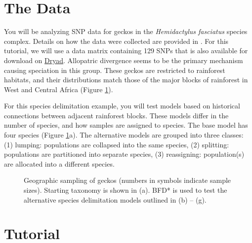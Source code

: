 \documentclass{article}
\begin{document}
\section{The Data}
You will be analyzing SNP data for geckos in the \textit{Hemidactylus fasciatus} species complex. Details on how the data were collected are 
provided in \citep{Leache14}. For this tutorial, we will use a data matrix containing 129 SNPs that is also available for download on \href{http://datadryad.org/resource/doi:10.5061/dryad.r55fb}{Dryad}. Allopatric divergence seems to be the primary mechanism causing speciation in this group. These geckos are restricted to rainforest habitats, and their distributions match those of the major blocks of rainforest in West and Central Africa (Figure \ref{fig:map}). 

For this species delimitation example, you will test models based on historical connections between adjacent rainforest blocks. These models differ in the number of species, and how samples are assigned to species. The base model has four species (Figure \ref{fig:map}a). The alternative models are grouped into three classes: (1) lumping: populations are collapsed into the same species, (2) splitting: populations are partitioned into separate species, (3) reassigning: population(s) are allocated into a different species.

    \begin{figure}[htbp]
        \centering
        \caption{Geographic sampling of geckos (numbers in symbols indicate sample sizes). Starting taxonomy is shown in (a). BFD* is used to test the alternative species delimitation models outlined in (b) -- (g).}
        \label{fig:map}
    \end{figure}

\section{Tutorial}
\newcommand{\step}[2]{\addtocounter{stepCounter}{1} {\bf \hypertarget{step\arabic{stepCounter}}{Step \arabic{stepCounter}:}}\xspace #2\par}
\newcommand{\intermediate}[1]{#1}

\end{document}
